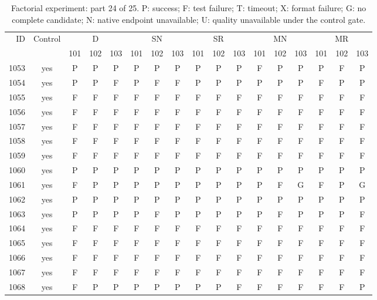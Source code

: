 \begin{table}[p]\centering\footnotesize
\setlength{\tabcolsep}{3pt}
\caption{Factorial experiment: part 24 of 25. P: success; F: test failure; T: timeout; X: format failure; G: no complete candidate; N: native endpoint unavailable; U: quality unavailable under the control gate.}
\begin{tabular*}{\textwidth}{@{\extracolsep{\fill}}rcccccccccccccccc}\toprule
ID & Control & \multicolumn{3}{c}{D} & \multicolumn{3}{c}{SN} & \multicolumn{3}{c}{SR} & \multicolumn{3}{c}{MN} & \multicolumn{3}{c}{MR}\\
\cmidrule(lr){3-5}\cmidrule(lr){6-8}\cmidrule(lr){9-11}\cmidrule(lr){12-14}\cmidrule(lr){15-17}
 & & 101 & 102 & 103 & 101 & 102 & 103 & 101 & 102 & 103 & 101 & 102 & 103 & 101 & 102 & 103\\\midrule
1053 & yes & P & P & P & P & P & P & P & P & P & F & P & P & P & F & P\\
1054 & yes & P & P & F & P & F & F & P & P & P & P & P & P & F & P & P\\
1055 & yes & F & F & F & F & F & F & F & F & F & F & F & F & F & F & F\\
1056 & yes & F & F & F & F & F & F & F & F & F & F & F & F & F & F & F\\
1057 & yes & F & F & F & F & F & F & F & F & F & F & F & F & F & F & F\\
1058 & yes & F & F & F & F & F & F & F & F & F & F & F & F & F & F & F\\
1059 & yes & F & F & F & F & F & F & F & F & F & F & F & F & F & F & F\\
1060 & yes & P & P & P & P & P & P & P & P & P & P & P & P & P & P & P\\
1061 & yes & F & P & P & P & P & P & P & P & P & P & F & G & F & P & G\\
1062 & yes & P & P & P & P & P & P & P & P & P & P & P & P & P & P & P\\
1063 & yes & P & P & P & P & F & P & P & P & P & P & F & P & P & P & F\\
1064 & yes & F & F & F & F & F & F & F & F & F & F & F & F & F & F & F\\
1065 & yes & F & F & F & F & F & F & F & F & F & F & F & F & F & F & F\\
1066 & yes & F & F & F & F & F & F & F & F & F & F & F & F & F & F & F\\
1067 & yes & F & F & F & F & F & F & F & F & F & F & F & F & F & F & F\\
1068 & yes & F & P & P & P & P & P & P & P & F & F & F & F & F & F & P\\

\end{tabular*}
\end{table}
